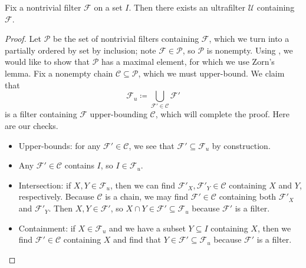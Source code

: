 \documentclass[../notes.tex]{subfiles}
\begin{document}
\begin{proposition}
	Fix a nontrivial filter $\mathcal F$ on a set $I$. Then there exists an ultrafilter $\mathcal U$ containing $\mathcal F$.
\end{proposition}
\begin{proof}
	Let $\mathcal P$ be the set of nontrivial filters containing $\mathcal F$, which we turn into a partially ordered by set by inclusion; note $\mathcal F\in\mathcal P$, so $\mathcal P$ is nonempty. Using , we would like to show that $\mathcal P$ has a maximal element, for which we use Zorn's lemma. Fix a nonempty chain $\mathcal C\subseteq\mathcal P$, which we must upper-bound. We claim that
	\[\mathcal F_u\coloneqq\bigcup_{\mathcal F'\in\mathcal C}\mathcal F'\]
	is a filter containing $\mathcal F$ upper-bounding $\mathcal C$, which will complete the proof. Here are our checks.
	\begin{itemize}
		\item Upper-bounds: for any $\mathcal F'\in\mathcal C$, we see that $\mathcal F'\subseteq\mathcal F_u$ by construction.
		\item Any $\mathcal F'\in\mathcal C$ contains $I$, so $I\in\mathcal F_u$.
		\item Intersection: if $X,Y\in\mathcal F_u$, then we can find $\mathcal F'_X,\mathcal F'_Y\in\mathcal C$ containing $X$ and $Y$, respectively. Because $\mathcal C$ is a chain, we may find $\mathcal F'\in\mathcal C$ containing both $\mathcal F'_X$ and $\mathcal F'_Y$. Then $X,Y\in\mathcal F'$, so $X\cap Y\in\mathcal F'\subseteq\mathcal F_u$ because $\mathcal F'$ is a filter.
		\item Containment: if $X\in\mathcal F_u$ and we have a subset $Y\subseteq I$ containing $X$, then we find $\mathcal F'\in\mathcal C$ containing $X$ and find that $Y\in\mathcal F'\subseteq\mathcal F_u$ because $\mathcal F'$ is a filter.
		\qedhere
	\end{itemize}
\end{proof}
\end{document}
